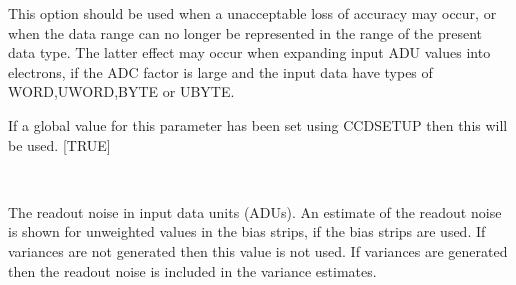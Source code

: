 \documentclass[twoside,11pt]{article}
\newcommand{\htmlref}[2]{#1}
\renewcommand{\_}{\texttt{\symbol{95}}}
\newcommand{\xroutine}[1]{\htmlref{{\sc #1}}{#1}}
\newcommand{\sstsubsection}[1]{ \item[{#1}] \mbox{} \\}
\newcommand{\sstsubsection}[1]{\item[{#1}]}
\begin{document}
{{{         This option should be used when a unacceptable loss of
         accuracy may occur, or when the data range can no longer be
         represented in the range of the present data type. The latter
         effect may occur when expanding input ADU values into
         electrons, if the ADC factor is large and the input data have
         types of \_WORD,\_UWORD,\_BYTE or \_UBYTE.

         If a global value for this parameter has been set using
         \xroutine{CCDSETUP} then this will be used.
         [TRUE]
      }
      \sstsubsection{
         RNOISE = \_DOUBLE (Read)
      } {
         The readout noise in input data units (ADUs). An estimate of
         the readout noise is shown for unweighted values in the bias
         strips, if the bias strips are used. If variances are not
         generated then this value is not used. If variances are
         generated then the readout noise is included in the variance
         estimates.

}}}
\end{document}
